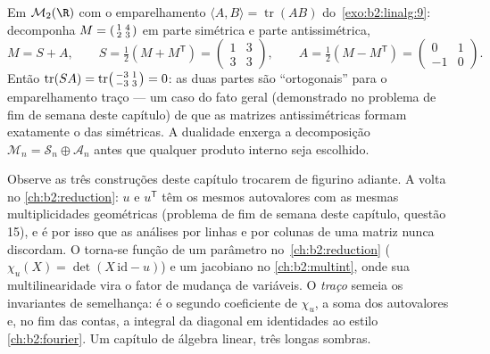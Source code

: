 \begin{example}\label{ex:b2:linalg:tracepairing}
Em $\mathcal{M}_2(\R)$ com o emparelhamento $\langle A, B\rangle =
\operatorname{tr}(AB)$ do~\cref{exo:b2:linalg:9}: decomponha $M =
\begin{psmallmatrix}1 & 4\\ 2 & 3\end{psmallmatrix}$ em
parte simétrica e parte antissimétrica,
\[
M = S + A, \qquad
S = \tfrac12(M + M^{\mathsf T}) =
\begin{pmatrix}1 & 3\\ 3 & 3\end{pmatrix},
\qquad
A = \tfrac12(M - M^{\mathsf T}) =
\begin{pmatrix}0 & 1\\ -1 & 0\end{pmatrix}.
\]
Então $\operatorname{tr}(SA) = \operatorname{tr}
\begin{psmallmatrix}-3 & 1\\ -3 & 3\end{psmallmatrix} = 0$: as
duas partes são ``ortogonais'' para o emparelhamento traço --- um
caso do fato geral (demonstrado no problema de fim de semana
deste capítulo) de que as matrizes antissimétricas formam exatamente o
 das simétricas. A dualidade enxerga a
decomposição $\mathcal{M}_n = \mathcal{S}_n \oplus
\mathcal{A}_n$ antes que qualquer produto interno seja escolhido.
\end{example}

\begin{remark}\label{rem:b2:linalg:perspectives}
Observe as três construções deste capítulo trocarem de figurino
adiante. A \emph{} volta no
\cref{ch:b2:reduction}: $u$ e $u^{\mathsf T}$ têm os mesmos
autovalores com as mesmas multiplicidades geométricas (problema de fim de
semana deste capítulo, questão 15), e é por isso que as análises por linhas e por colunas
de uma matriz nunca discordam. O \emph{}
torna-se função de um parâmetro no~\cref{ch:b2:reduction}
($\chi_u(X) = \det(X\,\mathrm{id} - u)$) e um jacobiano no
\cref{ch:b2:multint}, onde sua multilinearidade vira o
fator de mudança de variáveis. O \emph{traço} semeia os
invariantes de semelhança: é o segundo coeficiente de
$\chi_u$, a soma dos autovalores e, no fim das contas, a integral
da diagonal em identidades ao estilo \cref{ch:b2:fourier}. Um
capítulo de álgebra linear, três longas sombras.
\end{remark}

